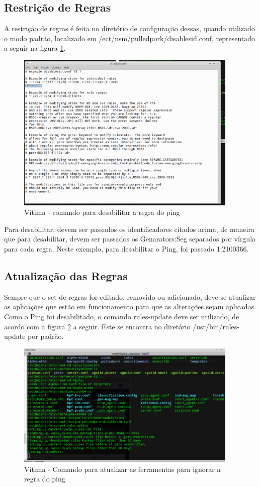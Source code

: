 \subsection{Restrição de Regras}
A restrição de regras é feita no diretório de configuração dessas, quando utilizado
o modo padrão, localizado em /ect/nsm/pulledpork/disablesid.conf, representado a
seguir na figura \ref{fig:comando_desabilita_regra_ping}.

 \begin{figure}[h]
  \centering
  \includegraphics[width=400px, scale=1]{resource/comando_desabilita_regra_ping}
  \caption{Vítima - comando para desabilitar a regra do ping}
\label{fig:comando_desabilita_regra_ping}
\end{figure}

Para desabilitar, devem ser passados os identificadores citados acima, de maneira
que para desabilitar, devem ser passados os Genarators:Seg separados por vírgula
para cada regra. Neste exemplo, para desabilitar o Ping, foi passado 1:2100366.

\subsection{Atualização das Regras}
Sempre que o set de regras for editado, removido ou adicionado, deve-se atualizar
as aplicações que estão em funcionamento para que as alterações sejam aplicadas.
Como o Ping foi desabilitado, o comando rules-update deve ser utilizado, de acordo
com a figura \ref{fig:rule_update} a seguir. Este se
encontra no diretório /usr/bin/rules-update por padrão.

 \begin{figure}[h]
  \centering
  \includegraphics[width=400px, scale=1]{resource/rule_update}
  \caption{Vítima - Comando para atualizar as ferramentas para ignorar a regra do ping}
\label{fig:rule_update}
\end{figure}


